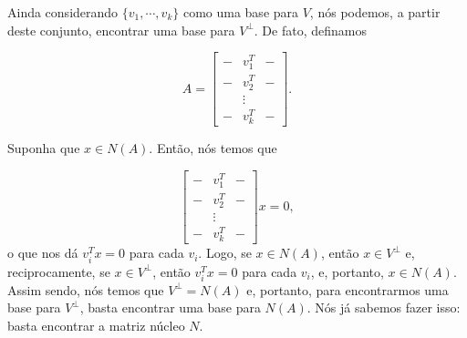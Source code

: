 Ainda considerando $\{v_1, \cdots, v_k\}$ como uma base para $V$, nós podemos, a partir deste conjunto, encontrar uma base para $V^\perp$. De fato, definamos

$$
A = \begin{bmatrix}
	- & v_1^T & - \\
	- & v_2^T & - \\
	& \vdots & \\
	- & v_k^T & -
\end{bmatrix}.
$$

Suponha que $x\in N(A)$. Então, nós temos que

$$
\begin{bmatrix}
	- & v_1^T & - \\
	- & v_2^T & - \\
	& \vdots & \\
	- & v_k^T & -
\end{bmatrix}x = 0,
$$
o que nos dá $v_i^Tx = 0$ para cada $v_i$. Logo, se $x\in N(A)$, então $x\in V^\perp$ e, reciprocamente, se $x\in V^\perp$, então $v_i^Tx = 0$ para cada $v_i$, e, portanto, $x\in N(A)$. Assim sendo, nós temos que $V^\perp = N(A)$ e, portanto, para encontrarmos uma base para $V^\perp$, basta encontrar uma base para $N(A)$. Nós já sabemos fazer isso: basta encontrar a matriz núcleo $N$.

